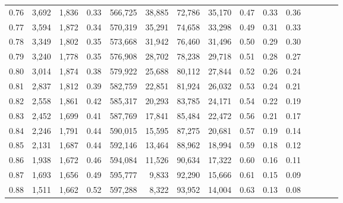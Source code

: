 \begin{tabular}{rrrcrrrrrrrrrrr}
0.76 &  3,692 &  1,836 &                                       0.33 &  566,725 &   38,885 &   72,786 &   35,170 &  0.47 &  0.33 &                         0.36 \\
0.77 &  3,594 &  1,872 &                                       0.34 &  570,319 &   35,291 &   74,658 &   33,298 &  0.49 &  0.31 &                         0.33 \\
0.78 &  3,349 &  1,802 &                                       0.35 &  573,668 &   31,942 &   76,460 &   31,496 &  0.50 &  0.29 &                         0.30 \\
0.79 &  3,240 &  1,778 &                                       0.35 &  576,908 &   28,702 &   78,238 &   29,718 &  0.51 &  0.28 &                         0.27 \\
0.80 &  3,014 &  1,874 &                                       0.38 &  579,922 &   25,688 &   80,112 &   27,844 &  0.52 &  0.26 &                         0.24 \\
0.81 &  2,837 &  1,812 &                                       0.39 &  582,759 &   22,851 &   81,924 &   26,032 &  0.53 &  0.24 &                         0.21 \\
0.82 &  2,558 &  1,861 &                                       0.42 &  585,317 &   20,293 &   83,785 &   24,171 &  0.54 &  0.22 &                         0.19 \\
0.83 &  2,452 &  1,699 &                                       0.41 &  587,769 &   17,841 &   85,484 &   22,472 &  0.56 &  0.21 &                         0.17 \\
0.84 &  2,246 &  1,791 &                                       0.44 &  590,015 &   15,595 &   87,275 &   20,681 &  0.57 &  0.19 &                         0.14 \\
0.85 &  2,131 &  1,687 &                                       0.44 &  592,146 &   13,464 &   88,962 &   18,994 &  0.59 &  0.18 &                         0.12 \\
0.86 &  1,938 &  1,672 &                                       0.46 &  594,084 &   11,526 &   90,634 &   17,322 &  0.60 &  0.16 &                         0.11 \\
0.87 &  1,693 &  1,656 &                                       0.49 &  595,777 &    9,833 &   92,290 &   15,666 &  0.61 &  0.15 &                         0.09 \\
0.88 &  1,511 &  1,662 &                                       0.52 &  597,288 &    8,322 &   93,952 &   14,004 &  0.63 &  0.13 &                         0.08 \\

\end{tabular}
